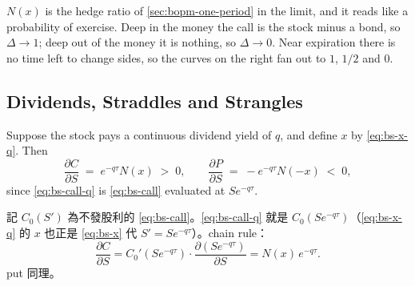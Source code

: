\suppstart
{}


\begin{intuition}
	$N(x)$ is the hedge ratio of \autoref{sec:bopm-one-period} in the limit, and it reads like a probability of exercise.
	Deep in the money the call is the stock minus a bond, so $\Delta\to1$; deep out of the money it is nothing, so $\Delta\to0$.
	Near expiration there is no time left to change sides, so the curves on the right fan out to $1$, $1/2$ and $0$.
\end{intuition}

\suppend

\subsection{Dividends, Straddles and Strangles}


Suppose the stock pays a continuous dividend yield of $q$, and define $x$ by \eqref{eq:bs-x-q}.
Then
\[
	\frac{\partial C}{\partial S} \;=\; e^{-q\tau}N(x) \;>\; 0 ,
	\qquad
	\frac{\partial P}{\partial S} \;=\; -e^{-q\tau}N(-x) \;<\; 0 ,
\]
\suppstart
since \eqref{eq:bs-call-q} is \eqref{eq:bs-call} evaluated at $Se^{-q\tau}$.

\suppend

\suppstart
\begin{remark}[補充]
	記 $C_{0}(S')$ 為不發股利的 \eqref{eq:bs-call}。\eqref{eq:bs-call-q} 就是 $C_{0}(Se^{-q\tau})$（\eqref{eq:bs-x-q} 的 $x$ 也正是 \eqref{eq:bs-x} 代 $S'=Se^{-q\tau}$）。chain rule：
	\[
		\frac{\partial C}{\partial S}=C_{0}'(Se^{-q\tau})\cdot\frac{\partial(Se^{-q\tau})}{\partial S}=N(x)\,e^{-q\tau} .
	\]
	put 同理。
\end{remark}
\suppend

